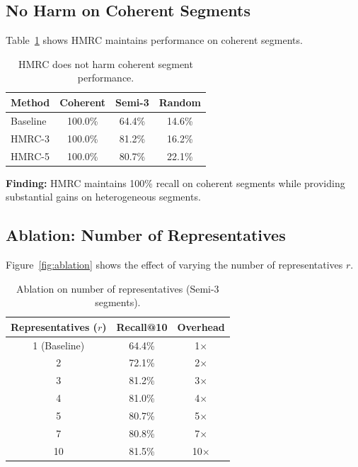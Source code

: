 \documentclass[sigconf, nonacm]{acmart}
\begin{document}
\subsection{No Harm on Coherent Segments}

Table~\ref{tab:noharm} shows HMRC maintains performance on coherent segments.

\begin{table}[h]
\caption{HMRC does not harm coherent segment performance.}
\label{tab:noharm}
\begin{tabular}{lccc}
\toprule
\textbf{Method} & \textbf{Coherent} & \textbf{Semi-3} & \textbf{Random} \\
\midrule
Baseline & 100.0\% & 64.4\% & 14.6\% \\
HMRC-3 & 100.0\% & 81.2\% & 16.2\% \\
HMRC-5 & 100.0\% & 80.7\% & 22.1\% \\
\bottomrule
\end{tabular}
\end{table}

\textbf{Finding:} HMRC maintains 100\% recall on coherent segments while providing substantial gains on heterogeneous segments.

\subsection{Ablation: Number of Representatives}

Figure~\ref{fig:ablation} shows the effect of varying the number of representatives $r$.


\begin{table}[h]
\caption{Ablation on number of representatives (Semi-3 segments).}
\label{tab:ablation}
\begin{tabular}{ccc}
\toprule
\textbf{Representatives ($r$)} & \textbf{Recall@10} & \textbf{Overhead} \\
\midrule
1 (Baseline) & 64.4\% & 1$\times$ \\
2 & 72.1\% & 2$\times$ \\
3 & 81.2\% & 3$\times$ \\
4 & 81.0\% & 4$\times$ \\
5 & 80.7\% & 5$\times$ \\
7 & 80.8\% & 7$\times$ \\
10 & 81.5\% & 10$\times$ \\
\bottomrule
\end{tabular}
\end{table}
\end{document}

